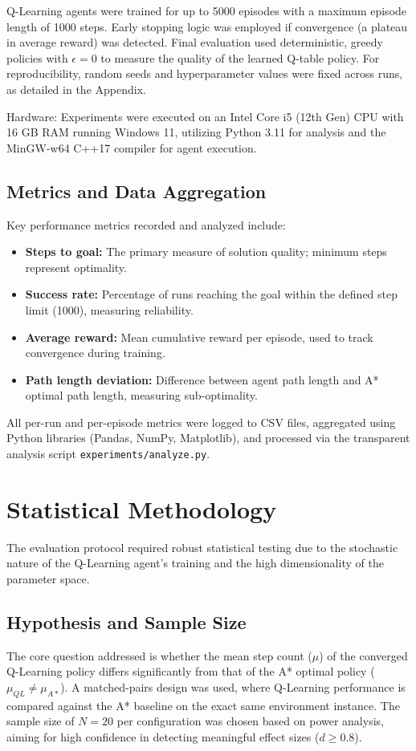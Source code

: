 \documentclass[conference]{IEEEtran}
\begin{document}
	Q-Learning agents were trained for up to 5000 episodes with a maximum episode length of 1000 steps. Early stopping logic was employed if convergence (a plateau in average reward) was detected. Final evaluation used deterministic, greedy policies with $\epsilon=0$ to measure the quality of the learned Q-table policy. For reproducibility, random seeds and hyperparameter values were fixed across runs, as detailed in the Appendix.
	
	Hardware: Experiments were executed on an Intel Core i5 (12th Gen) CPU with 16 GB RAM running Windows 11, utilizing Python 3.11 for analysis and the MinGW-w64 C++17 compiler for agent execution.
	
	\subsection{Metrics and Data Aggregation}
	Key performance metrics recorded and analyzed include:
	\begin{itemize}
		\item \textbf{Steps to goal:} The primary measure of solution quality; minimum steps represent optimality.
		\item \textbf{Success rate:} Percentage of runs reaching the goal within the defined step limit (1000), measuring reliability.
		\item \textbf{Average reward:} Mean cumulative reward per episode, used to track convergence during training.
		\item \textbf{Path length deviation:} Difference between agent path length and A* optimal path length, measuring sub-optimality.
	\end{itemize}
	All per-run and per-episode metrics were logged to CSV files, aggregated using Python libraries (Pandas, NumPy, Matplotlib), and processed via the transparent analysis script \texttt{experiments/analyze.py}.
	
	\section{Statistical Methodology}
	The evaluation protocol required robust statistical testing due to the stochastic nature of the Q-Learning agent's training and the high dimensionality of the parameter space.
	
	\subsection{Hypothesis and Sample Size}
	The core question addressed is whether the mean step count ($\mu$) of the converged Q-Learning policy differs significantly from that of the A* optimal policy ($\mu_{QL} \ne \mu_{A*}$). A matched-pairs design was used, where Q-Learning performance is compared against the A* baseline on the exact same environment instance. The sample size of $N=20$ per configuration was chosen based on power analysis, aiming for high confidence in detecting meaningful effect sizes ($d \ge 0.8$).
	
\end{document}
